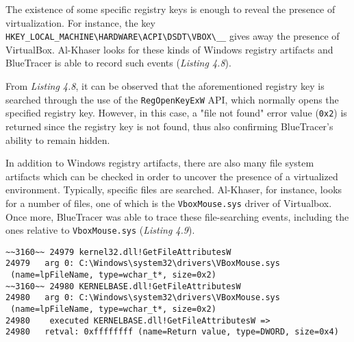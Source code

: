 The existence of some specific registry keys is enough to reveal the presence of virtualization. For instance, the key \texttt{HKEY\_LOCAL\_MACHINE\textbackslash}\texttt{{HARDWARE}\textbackslash{ACPI}\textbackslash{DSDT}}\texttt{\textbackslash{VBOX}\textbackslash\_\_}
gives away the presence of VirtualBox. Al-Khaser looks for these kinds of Windows registry artifacts and BlueTracer is able to record such events (\textit{Listing 4.8}).

From \textit{Listing 4.8}, it can be observed that the aforementioned registry key is searched through the use of the \texttt{RegOpenKeyExW} API, which normally opens the specified registry key. However, in this case, a "file not found" error value (\texttt{0x2}) is returned since the registry key is not found, thus also confirming BlueTracer's ability to remain hidden.

In addition to Windows registry artifacts, there are also many file system artifacts which can be checked in order to uncover the presence of a virtualized environment. Typically, specific files are searched. Al-Khaser, for instance, looks for a number of files, one of which is the \texttt{VboxMouse.sys} driver of Virtualbox. Once more, BlueTracer was able to trace these file-searching events, including the ones relative to \texttt{VboxMouse.sys} (\textit{Listing 4.9}). 

\vspace{0.5cm}
\begin{lstlisting}[caption={ Log portion relative to the search for \texttt{VboxMouse.sys} search},captionpos=b]
~~3160~~ 24979 kernel32.dll!GetFileAttributesW
24979 	arg 0: C:\Windows\system32\drivers\VBoxMouse.sys
 (name=lpFileName, type=wchar_t*, size=0x2)
~~3160~~ 24980 KERNELBASE.dll!GetFileAttributesW
24980 	arg 0: C:\Windows\system32\drivers\VBoxMouse.sys
 (name=lpFileName, type=wchar_t*, size=0x2)
24980    executed KERNELBASE.dll!GetFileAttributesW =>
24980 	retval: 0xffffffff (name=Return value, type=DWORD, size=0x4)
\end{lstlisting}

